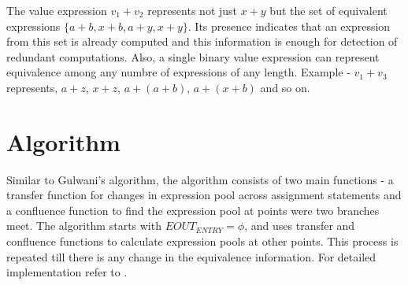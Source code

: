 The value expression $v_1 + v_2$ represents not just $x + y$ but the
set of equivalent expressions $\{a + b, x + b, a + y, x + y\}$. Its 
presence indicates that an expression from this set is already 
computed and this information is enough for detection of redundant 
computations. Also, a single binary value expression can represent 
equivalence among any numbre of expressions of any length. Example - 
$v_1 + v_3$ represents, $a + z$, $x + z$, $a + (a + b)$, 
$a + (x + b)$ and so on.

\section{Algorithm}
Similar to Gulwani's algorithm, the algorithm consists of two main 
functions - a transfer function for changes in expression pool across 
assignment statements and a confluence function to find the 
expression pool at points were two branches meet. The algorithm 
starts with $EOUT_{ENTRY} = \phi$, and uses transfer and confluence 
functions to calculate expression pools at other points. This process 
is repeated till there is any change in the equivalence information.
For detailed implementation refer to \cite{Saleena}.
